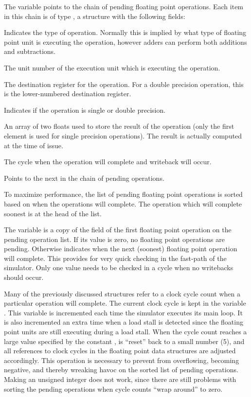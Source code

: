 The variable  points to the chain of pending floating point
operations.  Each item in this chain is of type , a structure
with the following fields:
\begin{mylist}
  \item [\code{type} \hfill] Indicates the type of operation.  Normally this is
   implied by what type of floating point unit is executing the operation, 
   however adders can perform both additions and subtractions.
  \item [\code{unit} \hfill] The unit number of the execution unit which is
   executing the operation.
  \item [\code{dest} \hfill] The destination register for the operation.  For a
   double precision operation, this is the lower-numbered destination register.
  \item[\code{isDouble} \hfill] Indicates if the operation is single or double
   precision.
  \item [\code{result} \hfill] An array of two floats used to store the result of the
   operation (only the first element is used for single precision operations).
   The result is actually computed at the time of issue.
  \item [\code{ready} \hfill] The cycle when the operation will complete and writeback
   will occur.
  \item[\code{nextPtr} \hfill] Points to the next  in the chain of
   pending operations.
\end{mylist}
To maximize performance, the list of pending floating point operations is
sorted based on when the operations will complete.  The operation which
will complete soonest is at the head of the list.

The variable  is a copy of the  field of the
first floating point operation on the pending operation list.  If its
value is zero, no floating point operations are pending.  Otherwise 
 indicates when the next (soonest) floating point operation will
complete.  This provides for very quick checking in the fast-path of the
simulator.  Only one value needs to be checked in a cycle when no
writebacks should occur.

Many of the previously
discussed  structures refer to a clock cycle count when a particular
operation will complete.  The current clock cycle is kept in the
variable .  This variable is incremented each time the
simulator executes its main loop.  It is also incremented an
extra time when a load stall is detected since the floating point units are
still executing during a load stall.  When the cycle count reaches a large value
specified by the constant ,  is ``reset''
back to a small number (5), and all references to clock cycles in the
floating point data structures are adjusted accordingly.  This operation is
necessary to prevent  from overflowing, becoming negative, and
thereby wreaking havoc on the sorted list of pending operations.  Making
 an unsigned integer does not work, since there are still
problems with sorting the pending operations when cycle counts ``wrap around''
to zero.

